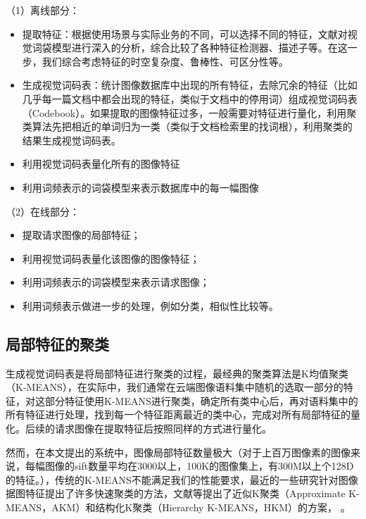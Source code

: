 （1）离线部分：
\begin{itemize}
\item 提取特征：根据使用场景与实际业务的不同，可以选择不同的特征，文献\cite{Zhang:2006ej}对视觉词袋模型进行深入的分析，综合比较了各种特征检测器、描述子等。在这一步，我们综合考虑特征的时空复杂度、鲁棒性、可区分性等。
\item 生成视觉词码表：统计图像数据库中出现的所有特征，去除冗余的特征（比如几乎每一篇文档中都会出现的特征，类似于文档中的停用词）组成视觉词码表（Codebook）。如果提取的图像特征过多，一般需要对特征进行量化，利用聚类算法先把相近的单词归为一类（类似于文档检索里的找词根），利用聚类的结果生成视觉词码表。
\item 利用视觉词码表量化所有的图像特征
\item 利用词频表示的词袋模型来表示数据库中的每一幅图像
\end{itemize}

（2）在线部分：
\begin{itemize}
\item 提取请求图像的局部特征；
\item 利用视觉词码表量化该图像的图像特征；
\item 利用词频表示的词袋模型来表示请求图像；
\item 利用词频表示做进一步的处理，例如分类，相似性比较等。
\end{itemize}


\subsection{局部特征的聚类}
生成视觉词码表是将局部特征进行聚类的过程，最经典的聚类算法是K均值聚类（K-MEANS），在实际中，我们通常在云端图像语料集中随机的选取一部分的特征，对这部分特征使用K-MEANS进行聚类，确定所有类中心后，再对语料集中的所有特征进行处理，找到每一个特征距离最近的类中心，完成对所有局部特征的量化。后续的请求图像在提取特征后按照同样的方式进行量化。

然而，在本文提出的系统中，图像局部特征数量极大（对于上百万图像素的图像来说，每幅图像的sift数量平均在3000以上，100K的图像集上，有300M以上个128D的特征。），传统的K-MEANS不能满足我们的性能要求，最近的一些研究针对图像据图特征提出了许多快速聚类的方法，文献\cite{Philbin:2007fk,Muja:2009uv,Wang:2010vs}等提出了近似K聚类（Approximate K-MEANS，AKM）和结构化K聚类（Hierarchy K-MEANS，HKM）的方案，
。

